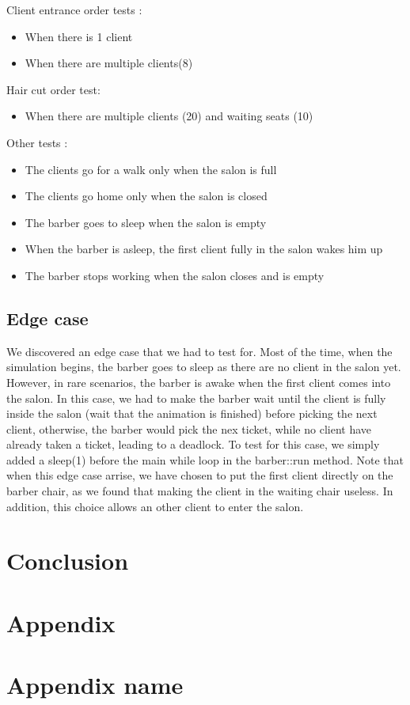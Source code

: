 \documentclass{article}
\begin{document}
    Client entrance order tests :
    \begin{itemize}
        \item When there is 1 client
        \item When there are multiple clients(8)
    \end{itemize}

    Hair cut order test:
    \begin{itemize}
        \item When there are multiple clients (20) and waiting seats (10)
    \end{itemize}

    Other tests :
    \begin{itemize}
        \item The clients go for a walk only when the salon is full
        \item The clients go home only when the salon is closed
        \item The barber goes to sleep when the salon is empty
        \item When the barber is asleep, the first client fully in the salon wakes him up
        \item The barber stops working when the salon closes and is empty
    \end{itemize}

    \subsection{Edge case}
    We discovered an edge case that we had to test for. Most of the time, when the simulation begins, the barber goes to sleep as there are no client in the salon yet. However, in rare scenarios, the barber is awake when the first client comes into the salon. In this case, we had to make the barber wait until the client is fully inside the salon (wait that the animation is finished) before picking the next client, otherwise, the barber would pick the nex ticket, while no client have already taken a ticket, leading to a deadlock. To test for this case, we simply added a sleep(1) before the main while loop in the barber::run method.
    Note that when this edge case arrise, we have chosen to put the first client directly on the barber chair, as we found that making the client in the waiting chair useless. In addition, this choice allows an other client to enter the salon.

    \section{Conclusion}

    \section*{Appendix}

    \section{Appendix name}
\end{document}
